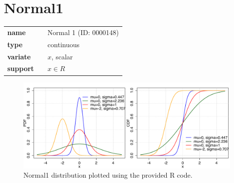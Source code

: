 %
\section*{Normal1} 

  \bigskip 

\begin{tabular}{p{2cm}cl}
\textbf{name} & & Normal 1 (ID: 0000148)\\ 
 
\textbf{type} & & continuous \\ 

\textbf{variate} & & $x$, scalar \\ 

\textbf{support} & & $x \in R$
\end{tabular}

\begin{figure}[ht!]
\centering
  \includegraphics[width=140mm]{pics/Normal1.pdf}
 \caption{Normal1 distribution plotted using the provided R code.}
 \label{fig:Normal1}
\end{figure}

